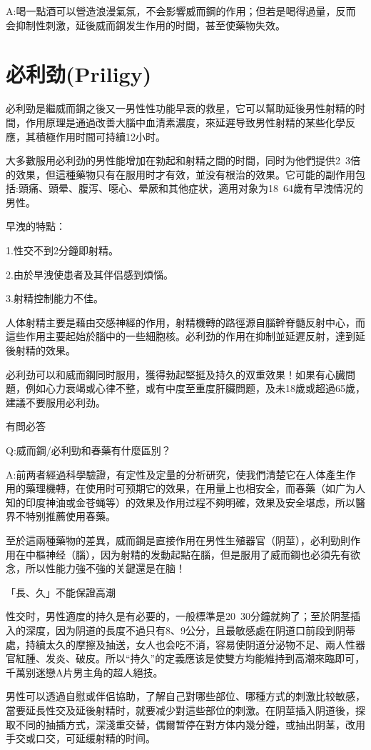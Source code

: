 \documentclass[12pt,UTF8]{ctexbook}
\begin{document}
A:喝一點酒可以營造浪漫氣氛，不会影響威而鋼的作用；但若是喝得過量，反而会抑制性刺激，延後威而鋼发生作用的时間，甚至使藥物失效。

\section{必利劲(Priligy)}

必利勁是繼威而鋼之後又一男性性功能早衰的救星，它可以幫助延後男性射精的时間，作用原理是通過改善大腦中血清素濃度，來延遲导致男性射精的某些化學反應，其積極作用时間可持續12小时。

大多數服用必利劲的男性能增加在勃起和射精之間的时間，同时为他們提供2~3倍的效果，但這種藥物只有在服用时才有效，並没有根治的效果。它可能的副作用包括:頭痛、頭晕、腹泻、噁心、晕厥和其他症状，適用对象为18~64歲有早洩情况的男性。

早洩的特點：

1.性交不到2分鐘即射精。

2.由於早洩使患者及其伴侣感到煩惱。

3.射精控制能力不佳。

人体射精主要是藉由交感神經的作用，射精機轉的路徑源自腦幹脊髓反射中心，而這些作用主要起始於腦中的一些細胞核。必利劲的作用在抑制並延遲反射，達到延後射精的效果。

必利劲可以和威而鋼同时服用，獲得勃起堅挺及持久的双重效果！如果有心臓問題，例如心力衰竭或心律不整，或有中度至重度肝臟問题，及未18歲或超過65歲，建議不要服用必利劲。

有問必答

Q:威而鋼/必利勁和春藥有什麼區別？

A:前两者經過科學驗證，有定性及定量的分析研究，使我們清楚它在人体產生作用的藥理機轉，在使用时可预期它的效果，在用量上也相安全，而春藥（如广为人知的印度神油或金苍蝇等）的效果及作用过程不夠明確，效果及安全堪虑，所以醫界不特别推薦使用春藥。

至於這兩種藥物的差異，威而鋼是直接作用在男性生殖器官（阴莖），必利勁則作用在中樞神经（腦），因为射精的发動起點在腦，但是服用了威而鋼也必須先有欲念，所以性能力強不強的关鍵還是在脑！

「長、久」不能保證高潮

性交时，男性適度的持久是有必要的，一般標準是20~30分鐘就夠了；至於阴茎插入的深度，因为阴道的長度不過只有8、9公分，且最敏感處在阴道口前段到阴蒂處，持續太久的摩擦及抽送，女人也会吃不消，容易使阴道分泌物不足、兩人性器官紅腫、发炎、破皮。所以“持久”的定義應该是使雙方均能維持到高潮來臨即可，千萬别迷戀A片男主角的超人絕技。

男性可以透過自慰或伴侣協助，了解自己對哪些部位、哪種方式的刺激比较敏感，當要延長性交及延後射精时，就要减少對這些部位的刺激。在阴莖插入阴道後，探取不同的抽插方式，深淺重交替，偶爾暂停在對方体内幾分鐘，或抽出阴茎，改用手交或口交，可延缓射精的时间。
\end{document}
